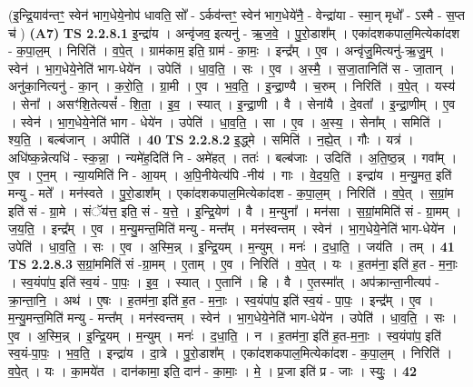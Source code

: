 \documentclass[17pt]{extarticle}
\begin{document}
                  \newline
                      (इ॒न्द्रि॒याव॑न्तꣳ॒॒ स्वेन॑ भाग॒धेये॒नोप॑ धावति॒ सो᳚ - ऽर्कव॑न्तꣳ॒॒ स्वेन॑ भाग॒धेये॑नै॒ - वेन्द्रा॑या - स्मा॒न् मृधो᳚ - ऽस्मै - स॒प्त च॑ )  \textbf{(A7)} \newline \newline
                                \textbf{ TS 2.2.8.1} \newline
                  इ॒न्द्रा॑य । अन्वृ॑जव॒ इत्यनु॑ - ऋ॒ज॒वे॒ । पु॒रो॒डाश᳚म् । एका॑दशकपाल॒मित्येका॑दश - क॒पा॒ल॒म् । निरिति॑ । व॒पे॒त् । ग्राम॑काम॒ इति॒ ग्राम॑ - का॒मः॒ । इन्द्र᳚म् । ए॒व । अन्वृ॑जु॒मित्यनु॑-ऋ॒जु॒म् । स्वेन॑ । भा॒ग॒धेये॒नेति॑ भाग-धेये॑न । उपेति॑ । धा॒व॒ति॒ । सः । ए॒व । अ॒स्मै॒ । स॒जा॒तानिति॑ स - जा॒तान् । अनु॑का॒नित्यनु॑ - का॒न् । क॒रो॒ति॒ । ग्रा॒मी । ए॒व । भ॒व॒ति॒ । इ॒न्द्रा॒ण्यै । च॒रुम् । निरिति॑ । व॒पे॒त् । यस्य॑ । सेना᳚ । असꣳ॑शि॒तेत्यसं᳚ - शि॒ता॒ । इ॒व॒ । स्यात् । इ॒न्द्रा॒णी । वै । सेना॑यै । दे॒वता᳚ । इ॒न्द्रा॒णीम् । ए॒व । स्वेन॑ । भा॒ग॒धेये॒नेति॑ भाग - धेये॑न । उपेति॑ । धा॒व॒ति॒ । सा । ए॒व । अ॒स्य॒ । सेना᳚म् । समिति॑ । श्य॒ति॒ । बल्ब॑जान् । अपीति॑ । \textbf{  40} \newline
                  \newline
                                \textbf{ TS 2.2.8.2} \newline
                  इ॒द्ध्मे । समिति॑ । न॒ह्ये॒त् । गौः । यत्र॑ । अधि॑ष्क॒न्नेत्यधि॑ - स्क॒न्ना॒ । न्यमे॑ह॒दिति॑ नि - अमे॑हत् । ततः॑ । बल्ब॑जाः । उदिति॑ । अ॒ति॒ष्ठ॒न्न् । गवा᳚म् । ए॒व । ए॒न॒म् । न्या॒यमिति॑ नि - आ॒यम् । अ॒पि॒नीयेत्य॑पि -नीय॑ । गाः । वे॒द॒य॒ति॒ । इन्द्रा॑य । म॒न्यु॒मत॒ इति॑ मन्यु - मते᳚ । मन॑स्वते । पु॒रो॒डाश᳚म् । एका॑दशकपाल॒मित्येका॑दश - क॒पा॒ल॒म् । निरिति॑ । व॒पे॒त् । स॒ग्रां॒म इति॑ सं - ग्रा॒मे । संॅय॑त्त॒ इति॒ सं - य॒त्ते॒ । इ॒न्द्रि॒येण॑ । वै । म॒न्युना᳚ । मन॑सा । स॒ग्रां॒ममिति॑ सं - ग्रा॒मम् । ज॒य॒ति॒ । इन्द्र᳚म् । ए॒व । म॒न्यु॒मन्त॒मिति॑ मन्यु - मन्त᳚म् । मन॑स्वन्तम् । स्वेन॑ । भा॒ग॒धेये॒नेति॑ भाग-धेये॑न । उपेति॑ । धा॒व॒ति॒ । सः । ए॒व । अ॒स्मि॒न्न् । इ॒न्द्रि॒यम् । म॒न्युम् । मनः॑ । द॒धा॒ति॒ । जय॑ति । तम् । \textbf{  41} \newline
                  \newline
                                \textbf{ TS 2.2.8.3} \newline
                  स॒ग्रां॒ममिति॑ सं -ग्रा॒मम् । ए॒ताम् । ए॒व । निरिति॑ । व॒पे॒त् । यः । ह॒तम॑ना॒ इति॑ ह॒त - म॒नाः॒ । स्व॒यंपा॑प॒ इति॑ स्व॒यं - पा॒पः॒ । इ॒व॒ । स्यात् । ए॒तानि॑ । हि । वै । ए॒तस्मा᳚त् । अप॑क्रान्ता॒नीत्यप॑ - क्रा॒न्ता॒नि॒ । अथ॑ । ए॒षः । ह॒तम॑ना॒ इति॑ ह॒त - म॒नाः॒ । स्व॒यंपा॑प॒ इति॑ स्व॒यं - पा॒पः॒ । इन्द्र᳚म् । ए॒व । म॒न्यु॒मन्त॒मिति॑ मन्यु - मन्त᳚म् । मन॑स्वन्तम् । स्वेन॑ । भा॒ग॒धेये॒नेति॑ भाग-धेये॑न । उपेति॑ । धा॒व॒ति॒ । सः । ए॒व । अ॒स्मि॒न्न् । इ॒न्द्रि॒यम् । म॒न्युम् । मनः॑ । द॒धा॒ति॒ । न । ह॒तम॑ना॒ इति॑ ह॒त-म॒नाः॒ । स्व॒यंपा॑प॒ इति॑ स्व॒यं-पा॒पः॒ । भ॒व॒ति॒ । इन्द्रा॑य । दा॒त्रे । पु॒रो॒डाश᳚म् । एका॑दशकपाल॒मित्येका॑दश - क॒पा॒ल॒म् । निरिति॑ । व॒पे॒त् । यः । का॒मये॑त । दान॑कामा॒ इति॒ दान॑ - का॒माः॒ । मे॒ । प्र॒जा इति॑ प्र - जाः । स्युः॒ । \textbf{  42} \newline
\end{document}
